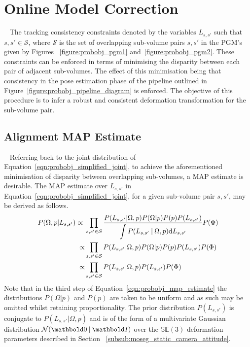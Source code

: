 \section{Online Model Correction}
~\label{sec:probobj_model_correction}
The tracking consistency constraints denoted by the variables \(L_{s, s'}\) such
that \(s, s' \in \mathcal{S}\), where \(\mathcal{S}\) is the set of overlapping
sub-volume pairs \(s, s'\) in the PGM's given by Figures
~\ref{figure:probobj_pgm1} and~\ref{figure:probobj_pgm2}. These constraints can be 
enforced in terms of minimising the disparity between each pair of adjacent sub-volumes. 
The effect of this minimisation being that consistency in the pose estimation phase of the
pipeline outlined in Figure~\ref{figure:probobj_pipeline_diagram} is enforced. The
objective of this procedure is to infer a robust and consistent deformation
transformation for the sub-volume pair.

\subsection{Alignment MAP Estimate}
~\label{subsec:probobj_alignment_map}
Referring back to the joint distribution of Equation~\ref{eqn:probobj_simplified_joint}, 
to achieve the aforementioned minimisation of disparity between overlapping sub-volumes, 
a MAP estimate is desirable. The MAP estimate over \(L_{s, s'}\) in 
Equation~\ref{eqn:probobj_simplified_joint}, for a given sub-volume pair \(s, s'\), may be
derived as follows.
\begin{align}
  \label{eqn:probobj_map_estimate}
  P(\Omega, p | L_{s, s'}) \propto{}& \prod_{s, s' \in \mathcal{S}}
  \frac{P(L_{s, s'} | \Omega, p) 
  P(\Omega | p)P(p)P(L_{s, s'})}
  {\displaystyle\int P(L_{s, s'} \:\vert\: \Omega, p)
  {\mathrm d{L_{s, s'}}}} P(\Phi) \\
  \propto& \prod_{s, s' \in \mathcal{S}} P(L_{s, s'} | \Omega, p) P(\Omega | p)
  P(p)P(L_{s, s'})P(\Phi) \\
  \propto& \prod_{s, s' \in \mathcal{S}} P(L_{s, s'} | \Omega, p)P(L_{s, s'})
  P(\Phi)
\end{align}
Note that in the third step of Equation~\ref{eqn:probobj_map_estimate} the
distributions \(P(\Omega | p)\) and \(P(p)\) are taken to be uniform and as such may
be omitted whilst retaining proportionality. The prior distribution \(P(L_{s, s'})\) is
conjugate to \(P(L_{s, s'} | \Omega, p)\) and is of the form of a multivariate
Gaussian distribution \(\mathcal{N}(\bm{0} \given \bm{I})\) over the
\(\mathbb{SE}(3)\) deformation parameters described in Section
~\ref{subsub:moseg_static_camera_attitude}. 

